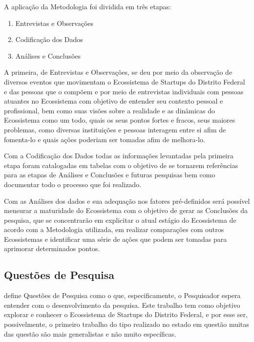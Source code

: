 A aplicação da Metodologia foi dividida em três etapas:

\begin{enumerate}
  \item Entrevistas e Observações
  \item Codificação dos Dados
  \item Análises e Conclusões
\end{enumerate}

A primeira, de Entrevistas e Observações, se deu por meio da observação de diversos eventos que movimentam o Ecossistema de Startups do Distrito Federal e das pessoas que o compõem e por meio de entrevistas individuais com pessoas atuantes no Ecossistema com objetivo de entender seu contexto pessoal e profissional, bem como suas visões sobre a realidade e as dinâmicas do Ecossistema como um todo, quais os seus pontos fortes e fracos, seus maiores problemas, como diversas instituições e pessoas interagem entre si afim de fomenta-lo e quais ações poderiam ser tomadas afim de melhora-lo.

Com a Codificação dos Dados todas as informações levantadas pela primeira etapa foram catalogadas em tabelas com o objetivo de se tornarem referências para as etapas de Análises e Conclusões e futuras pesquisas bem como documentar todo o processo que foi realizado. 

Com as Análises dos dados e sua adequação nos fatores pré-definidos será possível mensurar a maturidade do Ecossistema com o objetivo de gerar as Conclusões da pesquisa, que se concentrarão em explicitar o atual estágio do Ecossistema de acordo com a Metodologia utilizada, em realizar comparações com outros Ecossistemas e identificar uma série de ações que podem ser tomadas para aprimorar determinados pontos.

\subsection{Questões de Pesquisa}
\label{subsection:questoes_de_pesquisa}

 define Questões de Pesquisa como o que, especificamente, o Pesquisador espera entender com o desenvolvimento da pesquisa. Este trabalho tem como objetivo explorar e conhecer o Ecossistema de Startups do Distrito Federal, e por esse ser, possivelmente, o primeiro trabalho do tipo realizado no estado em questão muitas das questão são mais generalistas e não muito específicas.

